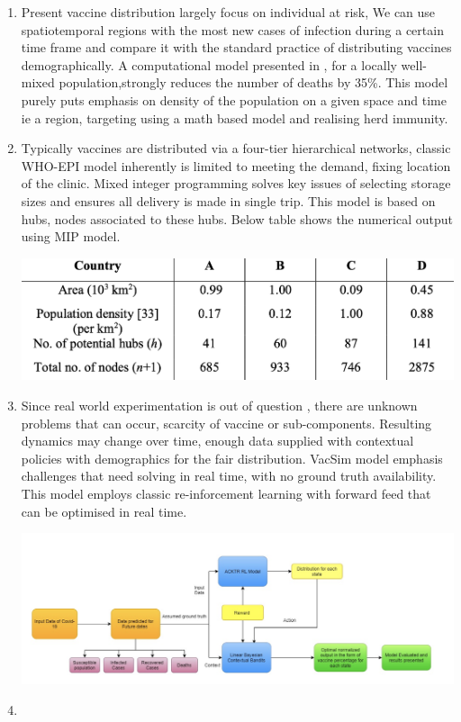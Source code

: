 \documentclass{article}
\begin{document}
\begin{enumerate}
	\item Present vaccine distribution largely focus on individual at risk, We can use spatiotemporal regions with the most new cases of infection during a certain time frame and compare it with the standard practice of distributing vaccines demographically. A computational model presented in\cite{grauer2020strategic} , for a locally well-mixed population,strongly reduces the number of deaths by 35\%. This model purely puts emphasis on density of the population on a given space and time ie a region, targeting using a math based model and realising herd immunity.
	\item Typically vaccines are distributed via a four-tier hierarchical networks, classic WHO-EPI model inherently is limited to meeting the demand, fixing location of the clinic. Mixed integer programming solves key issues of selecting storage sizes and ensures all delivery is made in single trip\cite{yang2020optimizing}. This model is based on hubs, nodes associated to these hubs. Below table shows the numerical output using MIP model.
  
	\includegraphics[scale=0.4]{maths.png}
	\item Since real world experimentation is out of question , there are unknown problems that can occur, scarcity of vaccine or sub-components. Resulting dynamics may change over time, enough data supplied with contextual policies with demographics for the fair distribution. VacSim model emphasis challenges that need solving in real time, with no ground truth availability. This model employs classic re-inforcement learning with forward feed that can be optimised in real time.\cite{awasthi2020vacsim}

\includegraphics[width=\textwidth]{model.png}
	\item 

\end{enumerate} 
 
\end{document}
